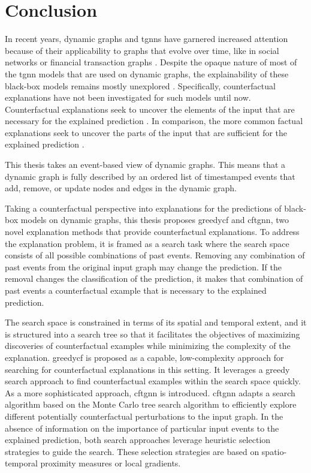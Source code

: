 \section{Conclusion}
\label{s_Conclusion}

In recent years, dynamic graphs and \glspl{tgnn} have garnered increased attention because of their applicability to graphs that evolve over time, like in social networks \cite{rossi_temporal_2020} or financial transaction graphs \cite{trivedi_dyrep_2019}. Despite the opaque nature of most of the \gls{tgnn} models that are used on dynamic graphs, the explainability of these black-box models remains mostly unexplored \cite{xia_explaining_2023}. Specifically, counterfactual explanations have not been investigated for such models until now. Counterfactual explanations seek to uncover the elements of the input that are necessary for the explained prediction \cite{tan_learning_2022}. In comparison, the more common factual explanations seek to uncover the parts of the input that are sufficient for the explained prediction \cite{tan_learning_2022}.

This thesis takes an event-based view of dynamic graphs. This means that a dynamic graph is fully described by an ordered list of timestamped events that add, remove, or update nodes and edges in the dynamic graph.

Taking a counterfactual perspective into explanations for the predictions of black-box models on dynamic graphs, this thesis proposes \gls{greedycf} and \gls{cftgnn}, two novel explanation methods that provide counterfactual explanations. To address the explanation problem, it is framed as a search task where the search space consists of all possible combinations of past events. Removing any combination of past events from the original input graph may change the prediction. If the removal changes the classification of the prediction, it makes that combination of past events a counterfactual example that is necessary to the explained prediction.

The search space is constrained in terms of its spatial and temporal extent, and it is structured into a search tree so that it facilitates the objectives of maximizing discoveries of counterfactual examples while minimizing the complexity of the explanation. \gls{greedycf} is proposed as a capable, low-complexity approach for searching for counterfactual explanations in this setting. It leverages a greedy search approach to find counterfactual examples within the search space quickly. As a more sophisticated approach, \gls{cftgnn} is introduced. \gls{cftgnn} adapts a search algorithm based on the Monte Carlo tree search algorithm to efficiently explore different potentially counterfactual perturbations to the input graph. In the absence of information on the importance of particular input events to the explained prediction, both search approaches leverage heuristic selection strategies to guide the search. These selection strategies are based on spatio-temporal proximity measures or local gradients.

